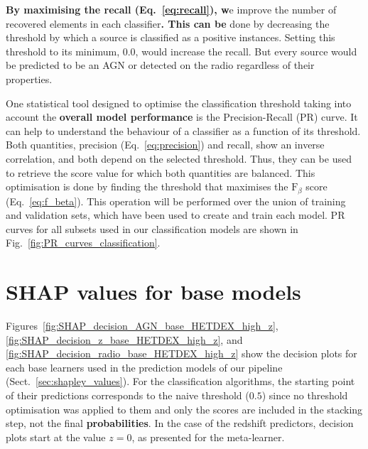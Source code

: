 \documentclass{aa}
\begin{document}
\begin{appendix}
\textbf{By maximising the recall  (Eq.~\ref{eq:recall}), w}e improve the number of recovered elements in each classifier\textbf{. This can be} done by decreasing the threshold by which a source is classified as a positive instances. Setting this threshold to its minimum, $0.0$, would  increase the recall. But every source would be predicted to be an AGN or detected on the radio regardless of their properties.%

One statistical tool designed to optimise the classification threshold taking into account the \textbf{overall model performance} is the Precision-Recall (PR) curve. It can help to understand the behaviour of a classifier as a function of its threshold. Both quantities, precision (Eq.~\ref{eq:precision}) and recall, show an inverse correlation, and both depend on the selected threshold. Thus, they can be used to retrieve the score value for which both quantities are balanced. This optimisation is done by finding the threshold that maximises the $\mathrm{F}_{\beta}$ score (Eq.~\ref{eq:f_beta}). This operation will be performed over the union of training and validation sets, which have been used to create and train each model. PR curves for all subsets used in our classification models are shown in Fig.~\ref{fig:PR_curves_classification}.

\section{SHAP values for base models}\label{sec:app_shap_base}

Figures~\ref{fig:SHAP_decision_AGN_base_HETDEX_high_z}, \ref{fig:SHAP_decision_z_base_HETDEX_high_z}, and \ref{fig:SHAP_decision_radio_base_HETDEX_high_z} show the decision plots for each base learners used in the prediction models of our pipeline (Sect.~\ref{sec:shapley_values}). For the classification algorithms, the starting point of their predictions corresponds to the naive threshold ($0.5$) since no threshold optimisation was applied to them and only the scores are included in the stacking step, not the final \textbf{probabilities}. In the case of the redshift predictors, decision plots start at the value $z {=} 0$, as presented for the meta-learner.


\end{appendix}
\end{document}
